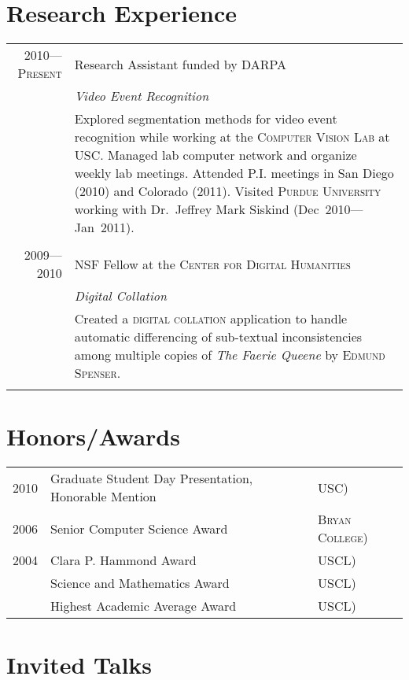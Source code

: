 \documentclass[a4paper,10pt]{article}
\begin{document}
\section{Research Experience}
\begin{tabular}{r|p{11cm}}
\textsc{2010---Present}
& Research Assistant funded by \textsc{DARPA} \\
&\emph{Video Event Recognition}\\
&\footnotesize{Explored segmentation methods for video event recognition while working at the \textsc{Computer Vision Lab} at \textsc{USC}. Managed lab computer network and organize weekly lab meetings.  Attended P.I. meetings in San Diego (2010) and Colorado (2011). Visited \textsc{Purdue University} working with Dr.~Jeffrey Mark Siskind (Dec~2010---Jan~2011).}
\\\multicolumn{2}{c}{} \\
\textsc{2009---2010}
& NSF Fellow at the \textsc{Center for Digital Humanities} \\
&\emph{Digital Collation}\\
&\footnotesize{Created a \textsc{digital collation} application to handle automatic differencing of sub-textual inconsistencies among multiple copies of \emph{The Faerie Queene} by \textsc{Edmund Spenser}.}
\\\multicolumn{2}{c}{} \\
\end{tabular}

\section{Honors/Awards}
\begin{tabular}{rl @{\hspace{0.5em}(} l}
2010 & Graduate Student Day Presentation,  Honorable Mention & \textsc{USC})\\
2006 & Senior Computer Science Award & \textsc{Bryan College})\\
2004 & Clara P. Hammond Award & \textsc{USCL})\\
& Science and Mathematics Award & \textsc{USCL})\\
& Highest Academic Average Award & \textsc{USCL})\\
\end{tabular}

\section{Invited Talks}
\end{document}
